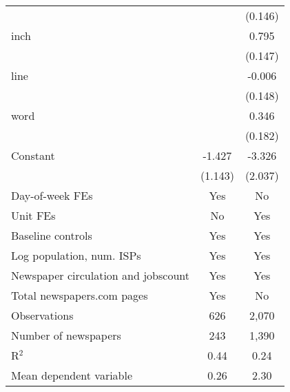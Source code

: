 {\begin{tabular}{l*{2}{c}}
                    &                     &     (0.146)         \\
\addlinespace
inch                &                     &       0.795\sym{***}\\
                    &                     &     (0.147)         \\
\addlinespace
line                &                     &      -0.006         \\
                    &                     &     (0.148)         \\
\addlinespace
word                &                     &       0.346\sym{*}  \\
                    &                     &     (0.182)         \\
\addlinespace
Constant            &      -1.427         &      -3.326         \\
                    &     (1.143)         &     (2.037)         \\
\addlinespace
Day-of-week FEs     &         Yes         &          No         \\
\addlinespace
Unit FEs            &          No         &         Yes         \\
\addlinespace
Baseline controls   &         Yes         &         Yes         \\
\addlinespace
Log population, num. ISPs &         Yes         &         Yes         \\
\addlinespace
Newspaper circulation and jobscount &         Yes         &         Yes         \\
\addlinespace
Total newspapers.com pages &         Yes         &          No         \\
\midrule
Observations        &         626         &       2,070         \\
Number of newspapers&         243         &       1,390         \\
R$^2$               &        0.44         &        0.24         \\
Mean dependent variable&        0.26         &        2.30         \\
\bottomrule
\end{tabular}
}

